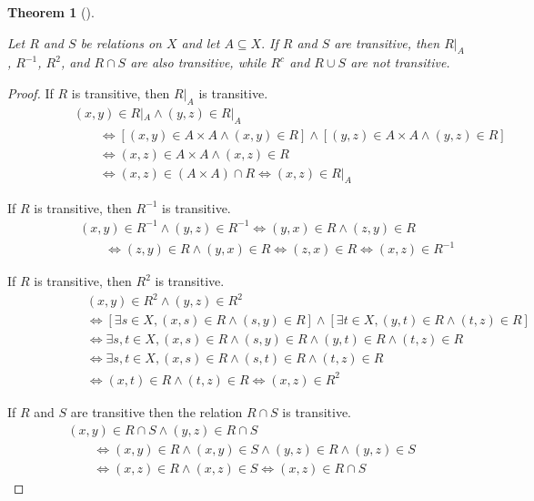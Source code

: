 \documentclass[
  letterpaper,
  10pt,
  reqno,
  twopage,
  openany]{book}
\theoremstyle{plain}
\theoremstyle{definition}
\theoremstyle{definition}
\theoremstyle{definition}
\theoremstyle{plain}
\theoremstyle{plain}
\newtheorem{theorem}{Theorem}[chapter]
\theoremstyle{remark}
\begin{document}
\leavevmode{}%
\begin{theorem}[]\label{thm-transitive}

Let \(R\) and \(S\) be relations on \(X\) and let \(A\subseteq X.\) If
\(R\) and \(S\) are transitive, then \(R|_A\), \(R^{-1}\), \(R^2\), and
\(R\cap S\) are also transitive, while \(R^c\) and \(R\cup S\) are not
transitive.

\end{theorem}

\begin{proof}

If \(R\) is transitive, then \(R|_{A}\) is transitive. \begin{align*}
\qquad \qquad & (x,y)\in  R|_A \land (y,z)\in R|_A \\ 
& \qquad \Longleftrightarrow [(x,y)\in A\times A \land (x,y)\in R] \land [(y,z)\in A\times A \land (y,z)\in R]\\ 
& \qquad \Longleftrightarrow (x,z)\in A\times A \land (x,z)\in R \\ 
& \qquad \Longleftrightarrow (x,z)\in (A\times A) \cap R \Longleftrightarrow (x,z)\in R|_A
\end{align*}

If \(R\) is transitive, then \(R^{-1}\) is transitive. \begin{align*}
\qquad \qquad & (x,y)\in R^{-1} \land (y,z)\in R^{-1} \Longleftrightarrow (y,x)\in R \land (z,y)\in R \\ 
& \qquad \Longleftrightarrow (z,y)\in R \land (y,x) \in R  \Longleftrightarrow (z,x)\in R \Longleftrightarrow (x,z)\in R^{-1}
\end{align*}

If \(R\) is transitive, then \(R^2\) is transitive. \begin{align*}
\quad \qquad \qquad & (x,y)\in R^2 \land (y,z)\in R^2 \\ 
& \Longleftrightarrow [\exists s\in X, (x,s)\in R \land (s,y)\in R] \land [\exists t\in X, (y,t)\in R \land (t,z)\in R] \\ 
& \Longleftrightarrow \exists s,t\in X, (x,s)\in R \land (s,y)\in R \land (y,t)\in R \land (t,z)\in R\\ 
& \Longleftrightarrow \exists s,t\in X, (x,s)\in R\land (s,t)\in R \land (t,z)\in R \\ 
& \Longleftrightarrow (x,t) \in R \land (t,z)\in R \Longleftrightarrow (x,z)\in R^2
\end{align*}

If \(R\) and \(S\) are transitive then the relation \(R\cap S\) is
transitive. \begin{align*}
& (x,y)\in R\cap S \land (y,z)\in R\cap S\\ 
& \qquad \Longleftrightarrow (x,y)\in R \land (x,y)\in S \land (y,z)\in R \land (y,z)\in S \\ 
& \qquad \Longleftrightarrow (x,z)\in R \land (x,z)\in S \Longleftrightarrow (x,z)\in R\cap S
\end{align*}


\end{proof}
\end{document}
